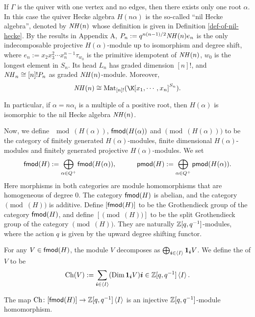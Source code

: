 \begin{example}
    If $\Gamma$ is the quiver with one vertex and no edges,
    then there exists only one root $\alpha$.
    In this case the quiver Hecke algebra $H(n\alpha)$
    is the so-called ``nil Hecke algebra'', denoted by $\mathit{NH}(n)$
    whose definition is given in Definition \ref{def-of-nil-hecke}.
    By the results in Appendix A, $P_n := q^{n(n-1)/2}\mathit{NH}(n)e_n$ is the only
    indecomposable projective $H(\alpha)$-module up to isomorphism and degree shift,
    where $e_n := x_2x_3^2\cdots x_n^{n-1}\tau_{w_0}$ 
    is the primitive idempotent of $\mathit{NH}(n)$, $w_0$ is the longest element in $S_n$. Its head $L_n$
    has graded dimension $[n]!$, and $\mathit{NH}_n\cong[n]!P_n$ as
    graded $\mathit{NH}(n)$-module. Moreover, 
    \[
        \NH(n)\cong\operatorname{Mat}
        _{[n]!}(\K[x_1,\cdots,x_n]^{S_n}).
    \]   
\end{example}

In particular, if $\alpha = n\alpha_i$ is a multiple of a positive root,
then $H(\alpha)$ is isomorphic to the nil Hecke algebra $\mathit{NH}(n)$.

Now, we define $\mod(H(\alpha))$, $\mathsf{fmod}(H(\alpha))$ and $\pmod(H(\alpha))$ to be the category
of finitely generated $H(\alpha)$-modules, finite dimensional $H(\alpha)$-modules and finitely generated
projective $H(\alpha)$-modules. We set 
\[
    \mathsf{fmod}(H) := \bigoplus_{\alpha\in Q^+}
    \mathsf{fmod}(H(\alpha)),\hspace{3em}\mathsf{pmod}(H) :=  \bigoplus_{\alpha\in Q^+}
    \mathsf{pmod}(H(\alpha)).
\]
Here morphisms in both categories are module homomorphisms
that are homogeneous of degree $0$. The category $\mathsf{fmod}(H)$ is abelian,
and the category $\pmod(H)$ is additive. Define $[\mathsf{fmod}(H)]$
to be the Grothendieck group of the category $\mathsf{fmod}(H)$, and define
$[\pmod(H)]$ to be the split Grothendieck group of the category $\pmod(H)$. They are
naturally $\mathbb{Z}[q,q^{-1}]$-modules, where the action $q$ is given by the
upward degree shifting functor.

For any $V\in\mathsf{fmod}(H)$, the module $V$ decomposes
as $\bigoplus_{\boldsymbol{i}\in\left<I\right>}\mathbf{1}_{\boldsymbol{i}}V$. We define the  of
$V$ to be 
\[
    \operatorname{Ch}(V) :=  \sum_{\boldsymbol{i}\in\left<I\right>} (\operatorname{Dim}\mathbf{1}_{\boldsymbol{i}}V)\boldsymbol{i}\in\mathbb{Z}[q,q^{-1}]\left<I\right>.
\]

\begin{proposition}[{\cite[Theorem 3.17]{KL1}}]
    The map $\operatorname{Ch}\colon[\mathsf{fmod}(H)]\to\mathbb{Z}[q,q^{-1}]\left<I\right>$ is an injective
    $\mathbb{Z}[q,q^{-1}]$-module homomorphism.
\end{proposition}

